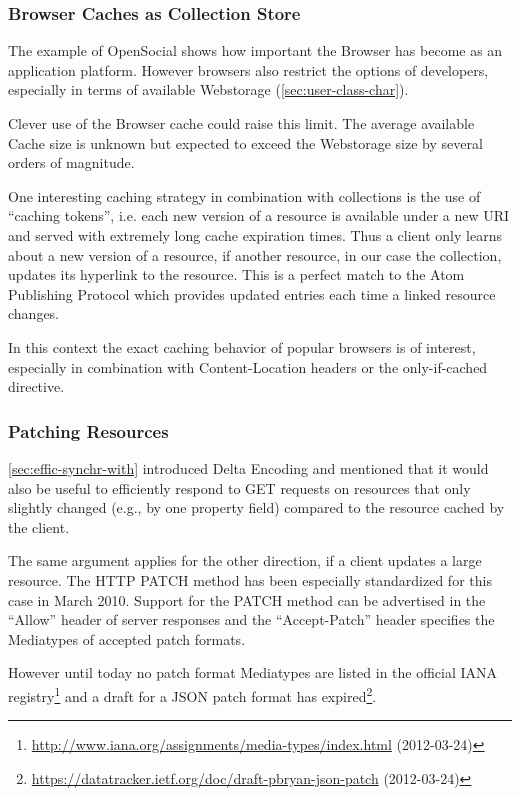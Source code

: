 \documentclass[12pt,a4paper,twoside]{scrartcl}		%
\newcommand{\citeurl}[2]{\url{#1} (#2)}
\begin{document}
\subsubsection{Browser Caches as Collection Store}
\label{sec:browser-caches-as}

The example of OpenSocial shows how important the Browser has become as an
application platform. However browsers also restrict the options of developers,
especially in terms of available Webstorage (\autoref{sec:user-class-char}).

Clever use of the Browser cache could raise this limit. The average available
Cache size is unknown but expected to exceed the Webstorage size by several
orders of magnitude.

One interesting caching strategy in combination with collections is the use of
``caching tokens'', i.e. each new version of a resource is available under a new
URI and served with extremely long cache expiration times. Thus a client only
learns about a new version of a resource, if another resource, in our case the
collection, updates its hyperlink to the resource. This is a perfect match to
the Atom Publishing Protocol which provides updated entries each time a linked
resource changes.

In this context the exact caching behavior of popular browsers is of interest,
especially in combination with Content-Location headers or the only-if-cached
directive.

\subsubsection{Patching Resources}
\label{sec:patching-resources}

\autoref{sec:effic-synchr-with} introduced Delta Encoding\cite{RFC3229} and
mentioned that it would also be useful to efficiently respond to GET requests on
resources that only slightly changed (e.g., by one property field) compared to
the resource cached by the client.

The same argument applies for the other direction, if a client updates a large
resource. The HTTP PATCH method\cite{RFC5789} has been especially standardized
for this case in March 2010. Support for the PATCH method can be advertised in
the ``Allow'' header of server responses and the ``Accept-Patch'' header
specifies the Mediatypes of accepted patch formats.

However until today no patch format Mediatypes are listed in the official IANA
registry\footnote{\citeurl{http://www.iana.org/assignments/media-types/index.html}{2012-03-24}}
and a draft for a JSON patch format has
expired\footnote{\citeurl{https://datatracker.ietf.org/doc/draft-pbryan-json-patch}{2012-03-24}}.
\end{document}
